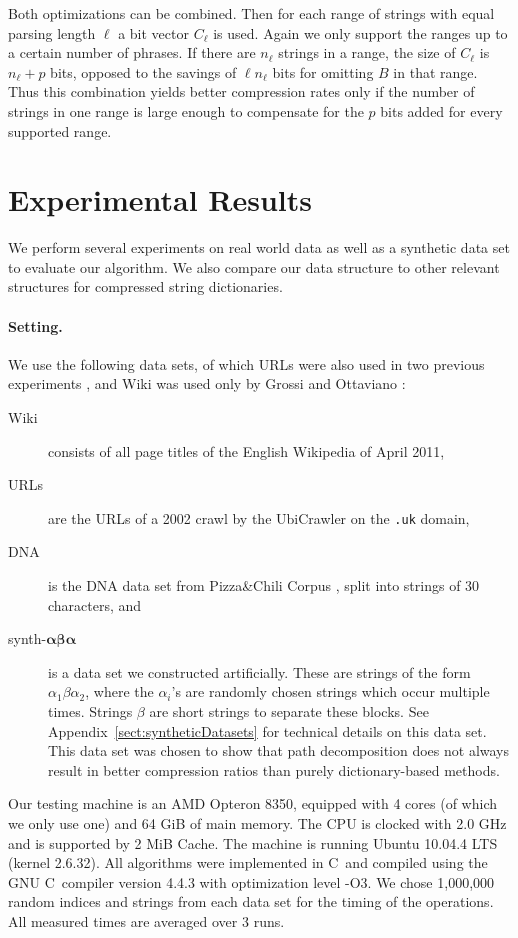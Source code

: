 \documentclass{llncs}
\newcommand{\Cpp}{C\raisebox{2pt}{{\relsize{-3}++}}\ }
\begin{document}
Both optimizations can be combined. Then for each range of strings with equal parsing length $\ell$ a bit vector $C_{\ell}$ is used. Again we only support the ranges up to a certain number of phrases. If there are $n_{\ell}$ strings in a range, the size of $C_{\ell}$ is $n_{\ell} + p$ bits, opposed to the savings of $\ell n_{\ell}$ bits for omitting $B$ in that range. Thus this combination yields better compression rates only if the number of strings in one range is large enough to compensate for the $p$ bits added for every supported range.

\section{Experimental Results}
We perform several experiments on real world data as well as a synthetic data set to evaluate our algorithm. We also compare our data structure to other relevant structures for compressed string dictionaries.
\paragraph{Setting.}
We use the following data sets, of which URLs were also used in two previous experiments \cite{grossi12fast,brisaboa11compressed}, and Wiki was used only by Grossi and Ottaviano \cite{grossi12fast}:
\begin{description}
\item[Wiki] consists of all page titles of the English Wikipedia of April 2011,
\item[URLs] are the URLs of a 2002 crawl by the UbiCrawler \cite{BCSV04-UbiCrawler} on the \texttt{.uk} domain,
\item[DNA] is the DNA data set from Pizza\&Chili Corpus \cite{PizzaChiliDNA}, split into strings of 30 characters, and
\item[synth-$\boldsymbol{\alpha\beta\alpha}$] is a data set we constructed artificially. These are strings of the form $\alpha_1\beta\alpha_2$, where the $\alpha_i$'s are randomly chosen strings which occur multiple times. Strings $\beta$ are short strings to separate these blocks. See Appendix~\ref{sect:syntheticDatasets} for technical details on 
this data set.
This data set was chosen to show that path decomposition does not always result in better compression ratios than purely dictionary-based methods.
\end{description}

Our testing machine is an AMD Opteron 8350, equipped with 4 cores (of which we only use one) and 64 GiB of main memory. The CPU is clocked with 2.0 GHz and is supported by 2 MiB Cache. The machine is running Ubuntu 10.04.4 LTS (kernel 2.6.32). All algorithms were implemented in \Cpp and compiled using the GNU \Cpp compiler version 4.4.3 with optimization level -O3. 
We chose 1,000,000 random indices and strings from each data set for the timing of the operations.
All measured times are averaged over 3 runs.
\end{document}
